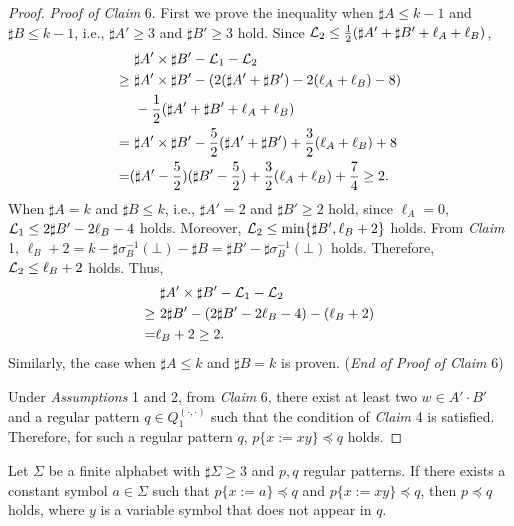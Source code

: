 \begin{proof}
\noindent
\textit{Proof of Claim} 6. 
First we prove the inequality when $\sharp A \leq k - 1$ and $\sharp B \leq k - 1$, i.e., $\sharp A' \geq 3$ and $\sharp B' \geq 3$ hold.
Since ${\cal L}_{2} \leq \frac{1}{2}(\sharp A' + \sharp B' + \ell_{A} + \ell_{B})$,
\begin{align*}
  &\ \sharp A' \times \sharp B' - {\cal L}_{1} - {\cal L}_{2}\\
\geq &\ \sharp A' \times \sharp B' - (2(\sharp A' + \sharp B') - 2(\ell_{A} + \ell_{B}) - 8)\\
  &\ - \frac{1}{2}(\sharp A' + \sharp B' + \ell_{A} + \ell_{B})\\
=    &\ \sharp A' \times \sharp B' - \frac{5}{2}(\sharp A' + \sharp B') + \frac{3}{2}(\ell_{A} + \ell_{B}) + 8\\
=    &(\sharp A' - \frac{5}{2})(\sharp B' - \frac{5}{2}) + \frac{3}{2}(\ell_{A} + \ell_{B}) + \frac{7}{4} \geq 2.
\end{align*}
When $\sharp A = k$ and $\sharp B \leq k$, i.e., $\sharp A' = 2$ and $\sharp B' \geq 2$ hold, since $\ell_{A} = 0$,
${\cal L}_{1} \leq 2\sharp B' - 2\ell_{B} -4$ holds.
Moreover, ${\cal L}_{2} \leq \min\{\sharp B', \ell_{B} + 2\}$ holds.
From \textit{Claim} 1, $\ell_B + 2 = k - \sharp\sigma^{-1}_{B}(\bot) - \sharp B = \sharp B' - \sharp\sigma^{-1}_{B}(\bot)$ holds. Therefore, ${\cal L}_{2} \leq \ell_{B} + 2$ holds.
Thus,
\begin{align*}
  &\ \sharp A' \times \sharp B' - {\cal L}_{1} - {\cal L}_{2}\\
\geq &\ 2\sharp B' - (2\sharp B' - 2\ell_{B} -4) - (\ell_{B} + 2)\\
= & \ell_B + 2 \geq 2.
\end{align*}
Similarly, the case when $\sharp A \leq k$ and $\sharp B = k$ is proven.
(\textit{End of Proof of Claim} {\color{red}6})

\smallskip

Under \textit{Assumptions} 1 and 2, from \textit{Claim} 6, there exist at least two $w\in A'\cdot B'$ and a regular pattern $q \in Q_{1}^{(\cdot,\cdot)}$ such that the condition of \textit{Claim} 4 is satisfied. 
Therefore, for such a regular pattern $q$, $p \{x := xy\} \preceq q$ holds.
\end{proof}


\begin{lem}\label{Sato1:Lemma15}%
Let $\Sigma$ be a finite alphabet with $\sharp \Sigma \ge 3$ and $p,q$ regular patterns.
If there exists a constant symbol $a \in \Sigma$ such that $p \{ x := a \} \preceq q$ and $p \{ x := xy \} \preceq q$, then $p \preceq q$ holds, where $y$ is a variable symbol that does not appear in $q$.
\end{lem}

